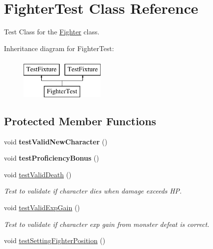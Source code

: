\hypertarget{class_fighter_test}{}\section{Fighter\+Test Class Reference}
\label{class_fighter_test}


Test Class for the \hyperlink{class_fighter}{Fighter} class.  


Inheritance diagram for Fighter\+Test\+:\begin{figure}[H]
\begin{center}
\leavevmode
\includegraphics[height=2.000000cm]{class_fighter_test}
\end{center}
\end{figure}
\subsection*{Protected Member Functions}
\begin{DoxyCompactItemize}
\item 
\hypertarget{class_fighter_test_af0641c84ec71e42b396280ec853cb093}{}\label{class_fighter_test_af0641c84ec71e42b396280ec853cb093} 
void {\bfseries test\+Valid\+New\+Character} ()
\item 
\hypertarget{class_fighter_test_a3d0a319b2acbf2b30dfc8202e6a87e9e}{}\label{class_fighter_test_a3d0a319b2acbf2b30dfc8202e6a87e9e} 
void {\bfseries test\+Proficiency\+Bonus} ()
\item 
\hypertarget{class_fighter_test_a14379ceead9ab87e992abe1feb769117}{}\label{class_fighter_test_a14379ceead9ab87e992abe1feb769117} 
void \hyperlink{class_fighter_test_a14379ceead9ab87e992abe1feb769117}{test\+Valid\+Death} ()
\begin{DoxyCompactList}\small\item\em Test to validate if character dies when damage exceeds HP. \end{DoxyCompactList}\item 
\hypertarget{class_fighter_test_a3eb36e11675d352e3328fddbb9828a5f}{}\label{class_fighter_test_a3eb36e11675d352e3328fddbb9828a5f} 
void \hyperlink{class_fighter_test_a3eb36e11675d352e3328fddbb9828a5f}{test\+Valid\+Exp\+Gain} ()
\begin{DoxyCompactList}\small\item\em Test to validate if character exp gain from monster defeat is correct. \end{DoxyCompactList}\item 
void \hyperlink{class_fighter_test_a751fd0a97704e1101eb58f4493681696}{test\+Setting\+Fighter\+Position} ()
\end{DoxyCompactItemize}


